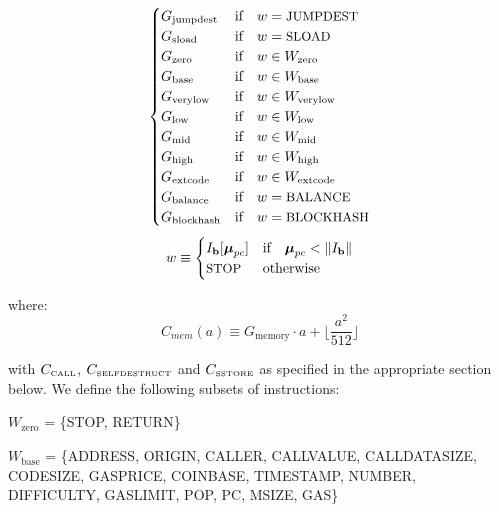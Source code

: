 \documentclass[9pt,oneside]{amsart}
\begin{document}
\begin{equation}
\begin{cases}
G_{\mathrm{jumpdest}} & \text{if} \quad w = \text{\small JUMPDEST}\\
G_{\mathrm{sload}} & \text{if} \quad w = \text{\small SLOAD}\\
G_{\mathrm{zero}} & \text{if} \quad w \in W_{\mathrm{zero}}\\
G_{\mathrm{base}} & \text{if} \quad w \in W_{\mathrm{base}}\\
G_{\mathrm{verylow}} & \text{if} \quad w \in W_{\mathrm{verylow}}\\
G_{\mathrm{low}} & \text{if} \quad w \in W_{\mathrm{low}}\\
G_{\mathrm{mid}} & \text{if} \quad w \in W_{\mathrm{mid}}\\
G_{\mathrm{\mathrm{high}}} & \text{if} \quad w \in W_{\mathrm{\mathrm{high}}}\\
G_{\mathrm{extcode}} & \text{if} \quad w \in W_{\mathrm{extcode}}\\
G_{\mathrm{balance}} & \text{if} \quad w = \text{\small BALANCE}\\
G_{\mathrm{blockhash}} & \text{if} \quad w = \text{\small BLOCKHASH}\\
\end{cases}
\end{equation}
\begin{equation}
w \equiv \begin{cases} I_\mathbf{b}[\boldsymbol{\mu}_{pc}] & \text{if} \quad \boldsymbol{\mu}_{pc} < \lVert I_\mathbf{b} \rVert\\
\text{\small STOP} & \text{otherwise}
\end{cases}
\end{equation}

where:
\begin{equation}
C_{mem}(a) \equiv G_{\mathrm{memory}} \cdot a + \Big\lfloor \dfrac{a^2}{512} \Big\rfloor
\end{equation}

with \hyperlink{tiny CALL}{$C_\text{\tiny CALL}$}, \hyperlink{C tiny SELFDESTRUCT}{$C_\text{\tiny SELFDESTRUCT}$} and \hyperlink{C tiny SSTORE}{$C_\text{\tiny SSTORE}$} as specified in the appropriate section below. We define the following subsets of instructions:

$W_{\mathrm{zero}}$ = \{{\small STOP}, {\small RETURN}\}

$W_{\mathrm{base}}$ = \{{\small ADDRESS}, {\small ORIGIN}, {\small CALLER}, {\small CALLVALUE}, {\small CALLDATASIZE}, {\small CODESIZE}, {\small GASPRICE}, {\small COINBASE},\newline \noindent\hspace*{1cm} {\small TIMESTAMP}, {\small NUMBER}, {\small DIFFICULTY}, {\small GASLIMIT}, {\small POP}, {\small PC}, {\small MSIZE}, {\small GAS}\}
\end{document}
